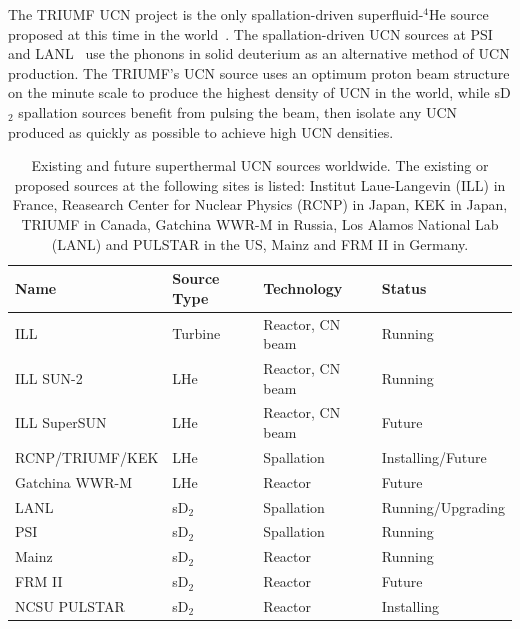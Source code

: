 The TRIUMF UCN project is the only spallation-driven superfluid-$^4$He
source proposed at this time in the world~\cite{Ruediger}. The
spallation-driven UCN sources at PSI~\cite{Ries_ascona} and
LANL~\cite{Ito_ascona} use the phonons in solid deuterium as an
alternative method of UCN production.
The TRIUMF's UCN source uses an optimum proton beam structure on the
minute scale to produce the highest density of UCN in the world, while
sD$_2$ spallation sources benefit from pulsing the beam, then isolate
any UCN produced as quickly as possible to achieve high UCN densities.


\begin{table}
\begin{center}
\begin{tabular}{|l|l|l|l|}
\hline
Name & Source Type & Technology & Status \\
\hline
ILL  & Turbine & Reactor, CN beam & Running
\\
\hline
ILL SUN-2 & LHe & Reactor, CN beam & Running 
\\
\hline
ILL SuperSUN & LHe & Reactor, CN beam & Future
\\
\hline
RCNP/TRIUMF/KEK & LHe & Spallation & Installing/Future
\\
\hline
Gatchina WWR-M & LHe & Reactor & Future
\\
\hline
LANL & sD$_2$ & Spallation & Running/Upgrading
\\
\hline
PSI & sD$_2$ & Spallation & Running
\\
\hline
Mainz & sD$_2$ & Reactor & Running
\\
\hline
FRM II & sD$_2$ & Reactor & Future
\\
\hline
NCSU PULSTAR & sD$_2$ & Reactor & Installing
\\
\hline 
\end{tabular}
\end{center}
\caption{Existing and future superthermal UCN sources worldwide. The existing or proposed sources at the following sites is listed: Institut Laue-Langevin (ILL) in France, Reasearch Center for Nuclear Physics (RCNP) in Japan, KEK in Japan, TRIUMF in Canada, 
Gatchina WWR-M in Russia, Los Alamos National Lab (LANL) and PULSTAR
in the US, Mainz and FRM II in Germany. }
\label{tab:full_ucn_sources}
\end{table}
